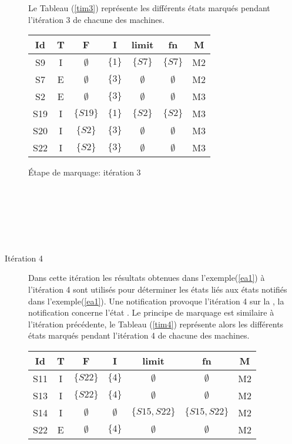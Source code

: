 \begin{Exemple}
\begin{description}
Le Tableau (\ref{tim3}) représente les différents états marqués pendant l'itération 3 de chacune des machines. 
	\begin{tableth}
	\centering
	\begin{tabular}{|*{7}{c|}}
		\hline
		Id&		T&			F&	I&	limit&	fn&		M\\
		\hline
		S9&	I&	$\emptyset$&	$\{1\}$&	$\{S7\}$   &	$\{S7\}$&	M2\\ \hline
		S7&	E&	$\emptyset$&	$\{3\}$&	$\emptyset$& $\emptyset$&	M2\\ \hline
		S2&	E&	$\emptyset$&	$\{3\}$&$\emptyset$& $\emptyset$	&	M3\\ \hline
		S19&I&	$\{S19\}$&	$\{1\}$&$\{S2\}$   & $\{S2\}$	&	M3\\ \hline
		S20&I&	$\{S2\}$&	$\{3\}$&$\emptyset$& $\emptyset$&	M3\\ \hline
		S22&I&	$\{S2\}$&	$\{3\}$&$\emptyset$& $\emptyset$&	M3\\ \hline
		
	\end{tabular}
	\caption{Étape de marquage: itération 3}\label{tim3}
\end{tableth}
\\\\\\\\\\
	\item[Itération 4] Dans cette itération les résultats obtenues dans l'exemple(\ref{ea1}) à l'itération 4 sont utilisés pour déterminer les états liés aux états notifiés dans l'exemple(\ref{ea1}). Une notification provoque l'itération 4 sur la \mtwo{}, la notification concerne l'état . Le principe de marquage est similaire à l'itération précédente, le Tableau (\ref{tim4}) représente alors les différents états marqués pendant l'itération 4 de chacune des machines. 
	\begin{tableth}
	\centering
	\begin{tabular}{|*{7}{c|}}
		\hline
		Id&		T&			F&	I&	limit&	fn&		M\\
		\hline
		S11&	I&	$\{S22\}$	&	$\{4\}$			&$\emptyset$	&$\emptyset$	&M2\\ \hline
		S13&	I&	$\{S22\}$	&	$\{4\}$			&$\emptyset$	&$\emptyset$	&M2\\ \hline
		S14&	I&	$\emptyset$	&$\emptyset$	&	$\{S15,S22\}$	&$\{S15,S22\}$	&M2\\ \hline
		S22&	E&	$\emptyset$	&	$\{4\}$			&$\emptyset$	&$\emptyset$	&M2\\ \hline
		

\end{tabular}
\end{tableth}
\end{description}
\end{Exemple}
